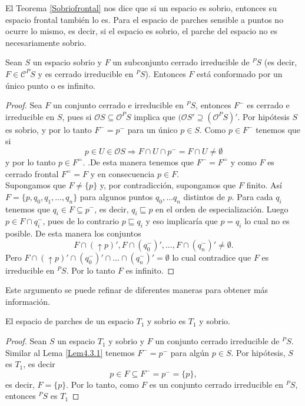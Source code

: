 El Teorema \ref{Sobriofrontal} nos dice que si un espacio es sobrio, entonces su espacio frontal también lo es. Para el espacio de parches sensible a puntos no ocurre lo mismo, es decir, si el espacio es sobrio, el parche del espacio no es necesariamente sobrio.

\begin{lem}\label{Lem4.3.1}
    Sean $S$ un espacio sobrio y $F$ un subconjunto cerrado irreducible de $^PS$ (es decir, $F\in \mathcal{C}^PS$ y es cerrado irreducible en  $^PS$). Entonces $F$ está conformado por un único punto o es infinito.
\end{lem}

\begin{proof}
    Sea $F$ un conjunto cerrado e irreducible en $^PS$, entonces $F^-$ es cerrado e irreducible en $S$, pues si $\mathcal{O}S\subseteq \mathcal{O}^PS$ implica que $(\mathcal{O}S'\supseteq (\mathcal{O}^PS)'$. Por hipótesis $S$ es sobrio, y por lo tanto $F^-=p^-$ para un único $p\in S$. Como $p\in F^-$ tenemos que si 
    \[
    p\in U\in \mathcal{O}S\Rightarrow F\cap U\cap p^-=F\cap U\neq \emptyset
    \]
    y por lo tanto $p\in F^=$. .De esta manera tenemos que $F^-=F^=$ y como $F$ es cerrado frontal $F^= =F$ y en consecuencia $p\in F$.\\

    Supongamos que $F\neq \{p\}$ y, por contradicción, supongamos que $F$ finito. Así $F=\{p, q_0, q_1, \dots , q_n\}$ para algunos puntos $q_0, \dots q_n$ distintos de $p$. Para cada $q_i$ tenemos que $q_i\in F\subseteq p^-$, es decir, $q_i\sqsubseteq p$ en el orden de especialización. Luego $p\in F\cap q_i^-$, pues de lo contrario $p\sqsubseteq q_i$ y eso implicaría que $p=q_i$ lo cual no es posible. De esta manera los conjuntos 
    \[
    F\cap (\uparrow p)', F\cap (q_0^-)', \dots , F\cap (q_n^-)'\neq \emptyset.
    \]
    Pero $F\cap (\uparrow p)'\cap (q_0^-)'\cap \dots \cap (q_n^-)'= \emptyset$ lo cual contradice que $F$ es irreducible en $^PS$. Por lo tanto $F$ es infinito.
\end{proof}

Este argumento se puede refinar de diferentes maneras para obtener más información.

\begin{lem}\label{Lem4.3.2}
    El espacio de parches de un espacio $T_1$ y sobrio es $T_1$ y sobrio.
\end{lem}

\begin{proof}
    Sean $S$ un espacio $T_1$ y sobrio y $F$ un conjunto cerrado irreducible de $^PS$. Similar al Lema \ref{Lem4.3.1} tenemos $F^-=p^-$ para algún $p\in S$. Por hipótesis, $S$ es $T_1$, es decir
    \[
    p\in F\subseteq F^-=p^-=\{p\},
    \]
    es decir, $F=\{p\}$. Por lo tanto, como $F$ es un conjunto cerrado irreducible en $^PS$, entonces $^PS$ es $T_1$
\end{proof}


